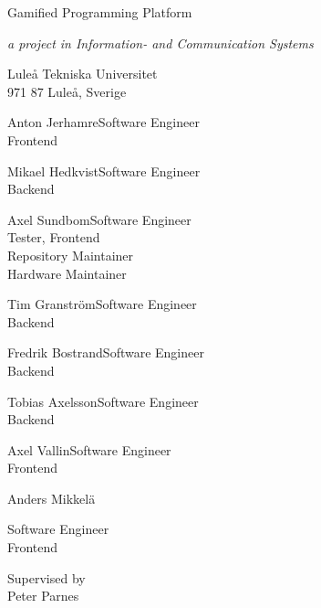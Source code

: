 \begin{center}
    {\LARGE Gamified Programming Platform}\par
    {\large\it a project in Information- and Communication Systems}
    \vspace{\baselineskip}

    {\Large Luleå Tekniska Universitet}\\{\large 971 87 Luleå, Sverige}\par
\end{center}

\vfill

            {Anton Jerhamre}{Software Engineer \\ Frontend}

            {Mikael Hedkvist}{Software Engineer \\ Backend}

            {Axel Sundbom}{Software Engineer \\ Tester, Frontend \\ Repository Maintainer \\ Hardware Maintainer}

            {Tim Granström}{Software Engineer\\ Backend}

            {Fredrik Bostrand}{Software Engineer \\ Backend}

            {Tobias Axelsson}{Software Engineer \\ Backend}

            {Axel Vallin}{Software Engineer \\ Frontend}


\begin{center}
    \begin{member}
    \centering
    Anders Mikkelä\par
        Software Engineer \\
        Frontend
    \end{member}
\end{center}

\vfill

\begin{center}
    Supervised by\\ Peter Parnes
\end{center}
